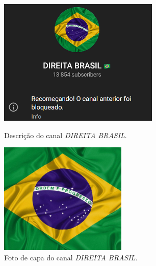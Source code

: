 \documentclass[portuguese]{textolivre}
\begin{document}
\begin{figure}[h!]
    \centering
    \begin{minipage}[t]{0.48\textwidth}
        \centering
        \includegraphics[width=\linewidth]{Imagens/Fig7.png}
        \caption{Descrição do canal \emph{DIREITA BRASIL}.}
        \label{fig-7}
    \end{minipage}
    \hfill
    \begin{minipage}[t]{0.44\textwidth}
        \centering
        \includegraphics[width=\linewidth]{Imagens/Fig8_1.png}
        \caption{Foto de capa do canal \emph{DIREITA BRASIL}.}
        \label{fig-8}
    \end{minipage}
\end{figure}
\end{document}
